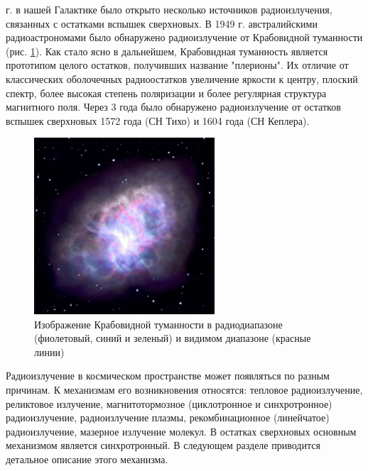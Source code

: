 \documentclass[a4paper,12pt]{extarticle}
\begin{document}
 г. в нашей Галактике было открыто несколько источников радиоизлучения, связанных с остатками вспышек сверхновых. В 1949 г. австралийскими радиоастрономами было обнаружено радиоизлучение от Крабовидной туманности (рис. \ref{fig:Сrab Nebula Rafio Optic}). 
Как стало ясно в дальнейшем, Крабовидная туманность является прототипом целого  остатков, получивших название "плерионы". 
Их отличие от классических оболочечных радиоостатков  
увеличение яркости к центру, плоский спектр, более высокая степень поляризации и более регулярная структура магнитного поля. 
Через 3 года было обнаружено радиоизлучение от остатков вспышек сверхновых 1572 года (СН Тихо)  и 1604 года (СН Кеплера). 

\begin{figure}[!htb] 
	\centering
	\includegraphics[width=0.6\textwidth]{M1TB2flat_large_Radio_Optic.jpg}
	\caption{
		Изображение Крабовидной туманности в радиодиапазоне (фиолетовый, синий и зеленый) и видимом диапазоне (красные линии) 
	}
	\label{fig:Сrab Nebula Rafio Optic}
\end{figure}


Радиоизлучение в космическом пространстве может появляться по разным причинам.
К механизмам его возникновения относятся: тепловое радиоизлучение, реликтовое излучение, магнитотормозное (циклотронное и синхротронное) радиоизлучение, радиоизлучение плазмы, рекомбинационное (линейчатое) радиоизлучение, мазерное излучение молекул. \cite{Kaplan1966}
В остатках сверхновых основным механизмом является синхротронный.
 В следующем разделе приводится детальное описание этого механизма.
 
\end{document}
